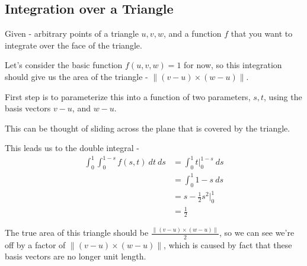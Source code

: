 \documentclass[landscape]{article}
\theoremstyle{definition}
\begin{document}
\pagebreak

\subsection{Integration over a Triangle}

Given - arbitrary points of a triangle $u, v, w$, and a function $f$ that you want to integrate over the face of the triangle.

Let's consider the basic function $f(u, v, w) = 1$ for now, so this integration should give us the area of the triangle - $\| (v - u) \times (w - u) \|$.

First step is to parameterize this into a function of two parameters, $s, t$, using the basis vectors $v-u$, and $w-u$.

This can be thought of sliding across the plane that is covered by the triangle.

This leads us to the double integral -
\begin{align*}
\int_0^1 \int_0^{1-s} f(s, t)\ dt\ ds
    &= \int_0^1 t |_0^{1-s}\ ds \\
    &= \int_0^1 1 - s\ ds \\
    &= s - \frac{1}{2}s^2 |_0^1 \\
    &= \frac{1}{2}
\end{align*}

The true area of this triangle should be $\frac{\|(v - u) \times (w - u)\|}{2}$, so we can see we're off by a factor of $\|(v - u) \times (w - u)\|$, which is caused by fact that these basis vectors are no longer unit length.
\end{document}
